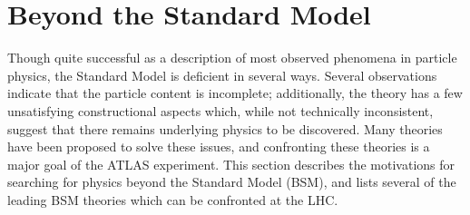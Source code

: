 \begin{table}[htbp]
       \centering
       \hfill
       \hfill
       \hfill
       \caption{Branching fractions of $W^{\pm}$ and $Z^0$ bosons to leptons and other final states~\cite{pdg}.}
       \label{table:theory-WZ-BR}
\end{table}


\section{Beyond the Standard Model}\label{sec:bsm}
Though quite successful as a description of most observed phenomena in particle physics, the Standard Model is deficient in several ways. Several observations indicate that the particle content is incomplete; additionally, the theory has a few unsatisfying constructional aspects which, while not technically inconsistent, suggest that there remains underlying physics to be discovered. Many theories have been proposed to solve these issues, and confronting these theories is a major goal of the ATLAS experiment. This section describes the motivations for searching for physics beyond the Standard Model (BSM), and lists several of the leading BSM theories which can be confronted at the LHC.

